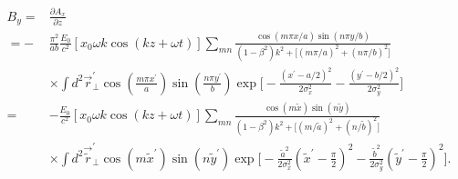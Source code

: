 \documentclass[11pt,oneside]{article}
\begin{document}
\begin{equation}
\begin{split}
  B_{y} = & \frac{ \partial A_{x} }{ \partial z } \\
=
- & \frac{\pi^{2}}{ab} \frac{E_{0}}{c^{2}}
    \left[ x_{0} \omega k \cos( k z+\omega t) \right]
    \sum_{mn}
    \frac{ \cos \left( m \pi x /a \right) \sin \left( n \pi y /b \right) }
         { \left( 1 - \beta^{2} \right) k^{2}
         + \Big[
           \left( m \pi /a \right)^{2} + \left( n \pi /b \right)^{2}
           \Big] } \\
  & \times
    \int d^{2} \vec{r}_{\perp}^{\prime}
    \cos \left( \frac{ m \pi x^{\prime} }{ a } \right)
    \sin \left( \frac{ n \pi y^{\prime} }{ b } \right)
    \exp \Bigg[
       - \frac{ \left( x^{\prime} - a/2 \right)^{2} }{ 2\sigma_{x}^{2}}
       - \frac{ \left( y^{\prime} - b/2 \right)^{2} }{ 2\sigma_{y}^{2}}
         \Bigg] \\
= &
  - \frac{E_{0}}{c^{2}}
    \left[ x_{0} \omega k \cos( k z+\omega t) \right]
    \sum_{mn}
    \frac{ \cos \left( m \tilde{x} \right) \sin \left( n \tilde{y} \right) }
         { \left( 1 - \beta^{2} \right) k^{2}
         + \Big[
           \left( m / \tilde{a} \right)^{2} + 
           \left( n / \tilde{b} \right)^{2} 
           \Big] } \\
  & \times
    \int d^{2} \vec{\tilde{r}}_{\perp}^{\prime}
    \cos \left( m \tilde{x}^{\prime} \right)
    \sin \left( n \tilde{y}^{\prime} \right)
    \exp \Bigg[
       - \frac{ \tilde{a}^{2} } { 2\sigma_{x}^{2}}
         \left( \tilde{x}^{\prime} - \frac{\pi}{2} \right)^{2}
       - \frac{ \tilde{b}^{2} } { 2\sigma_{y}^{2}}
         \left( \tilde{y}^{\prime} - \frac{\pi}{2} \right)^{2}
         \Bigg] . \\ 
\end{split}
\end{equation}

\end{document}
